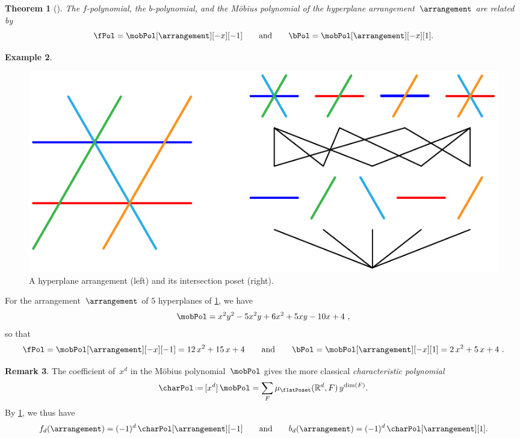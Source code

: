 \documentclass{amsart}
\newcommand{\darkblue}{\color{darkblue}} %
\newtheorem{theorem}{Theorem}[section]
\theoremstyle{definition}
\newtheorem{example}[theorem]{Example}
\newtheorem{remark}[theorem]{Remark}
\newcommand{\R}{\mathbb{R}} %
\newcommand{\eqdef}{\mbox{\,\raisebox{0.2ex}{\scriptsize\ensuremath{\mathrm:}}\ensuremath{=}\,}} %
\newcommand{\defn}[1]{\textsl{\darkblue #1}} %
\begin{document}
\begin{theorem}[{\cite[Thm.~A]{Zaslavsky}}]
\label{thm:Zaslavsky}
The $f$-polynomial, the $b$-polynomial, and the M\"obius polynomial of the hyperplane arrangement~$\arrangement$ are related by
\[
\fPol = \mobPol[\arrangement][-x][-1]
\qquad\text{and}\qquad
\bPol = \mobPol[\arrangement][-x][1].
\]
\end{theorem}

\begin{example}
%
\begin{figure}
	\centerline{\includegraphics[scale=.9]{intersectionPoset}}
	\caption{A hyperplane arrangement (left) and its intersection poset (right).}
	\label{fig:arrangement}
\end{figure}
%
For the arrangement~$\arrangement$ of $5$ hyperplanes of \cref{fig:arrangement}, we have
\[
\mobPol = x^2y^2 - 5x^2y + 6x^2 + 5xy - 10x + 4 \ ,
\]
so that
\[
\fPol = \mobPol[\arrangement][-x][-1] = 12 \, x^2 + 15 \, x + 4 
\qquad \text{and}\qquad
\bPol = \mobPol[\arrangement][-x][1] = 2 \, x^2 + 5 \, x + 4 \ .
\]
\end{example}

\begin{remark}
\label{rem:characteristicPolynomial}
The coefficient of~$x^d$ in the M\"obius polynomial~$\mobPol$ gives the more classical \defn{characteristic polynomial}
\[
\charPol \eqdef [x^d] \, \mobPol = \sum_F \mu_{\flatPoset}(\R^d,F) \, y^{\dim(F)} .
\]
By \cref{thm:Zaslavsky}, we thus have
\[
f_d(\arrangement) = (-1)^d \, \charPol[\arrangement][-1] 
\qquad\text{and}\qquad
b_d(\arrangement) = (-1)^d \, \charPol[\arrangement][1].
\]
\end{remark}
\end{document}
